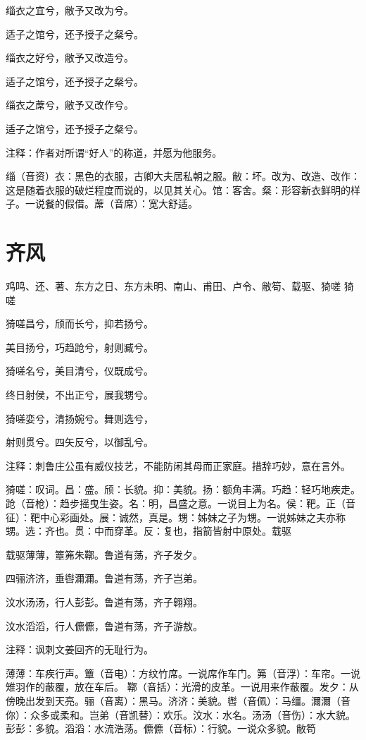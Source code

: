 \documentclass[12pt,UTF8]{ctexbook}
\begin{document}
缁衣之宜兮，敝予又改为兮。

适子之馆兮，还予授子之粲兮。

缁衣之好兮，敝予又改造兮。

适子之馆兮，还予授子之粲兮。

缁衣之蓆兮，敝予又改作兮。

适子之馆兮，还予授子之粲兮。

注释：作者对所谓“好人”的称道，并愿为他服务。

缁（音资）衣：黑色的衣服，古卿大夫居私朝之服。敝：坏。改为、改造、改作：这是随着衣服的破烂程度而说的，以见其关心。馆：客舍。粲：形容新衣鲜明的样子。一说餐的假借。蓆（音席）：宽大舒适。



\part{齐风}
鸡鸣、还、著、东方之日、东方未明、南山、甫田、卢令、敝笱、载驱、猗嗟
猗嗟

猗嗟昌兮，颀而长兮，抑若扬兮。

美目扬兮，巧趋跄兮，射则臧兮。

猗嗟名兮，美目清兮，仪既成兮。

终日射侯，不出正兮，展我甥兮。

猗嗟娈兮，清扬婉兮。舞则选兮，

射则贯兮。四矢反兮，以御乱兮。

注释：刺鲁庄公虽有威仪技艺，不能防闲其母而正家庭。措辞巧妙，意在言外。

猗嗟：叹词。昌：盛。颀：长貌。抑：美貌。扬：额角丰满。巧趋：轻巧地疾走。跄（音枪）：趋步摇曳生姿。名：明，昌盛之意。一说目上为名。侯：靶。正（音征）：靶中心彩画处。展：诚然，真是。甥：姊妹之子为甥。一说姊妹之夫亦称甥。选：齐也。贯：中而穿革。反：复也，指箭皆射中原处。载驱

载驱薄薄，簟笰朱鞹。鲁道有荡，齐子发夕。

四骊济济，垂辔濔濔。鲁道有荡，齐子岂弟。

汶水汤汤，行人彭彭。鲁道有荡，齐子翱翔。

汶水滔滔，行人儦儦，鲁道有荡，齐子游敖。

注释：讽刺文姜回齐的无耻行为。

薄薄：车疾行声。簟（音电）：方纹竹席。一说席作车门。笰（音浮）：车帘。一说雉羽作的蔽覆，放在车后。 鞹（音括）：光滑的皮革。一说用来作蔽覆。发夕：从傍晚出发到天亮。骊（音离）：黑马。济济：美貌。辔（音佩）：马缰。濔濔（音你）：众多或柔和。岂弟（音凯替）：欢乐。汶水：水名。汤汤（音伤）：水大貌。彭彭：多貌。滔滔：水流浩荡。儦儦（音标）：行貌。一说众多貌。敝笱
\end{document}
